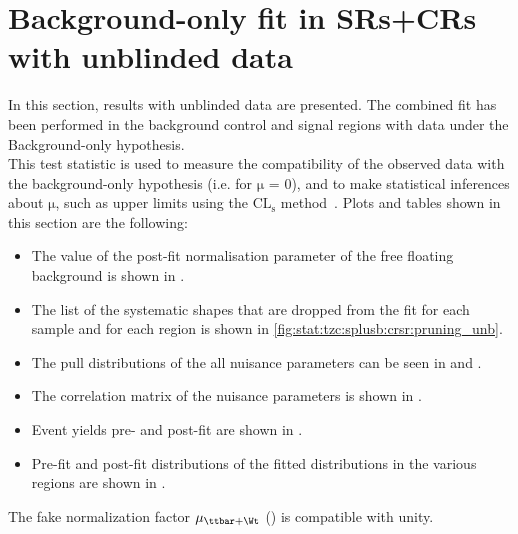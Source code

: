 \section{Background-only fit in SRs+CRs with unblinded data}
\label{sec:stat:tzc:unb}
In this section, results with unblinded data are presented. The combined fit has been performed in the background 
control and signal regions with data under the Background-only hypothesis.\\
This test statistic is used to measure the compatibility of the observed data with the background-only hypothesis 
(i.e. for $\mathrm{\mu}$ = 0), and to make statistical inferences about $\mathrm{\mu}$, such as upper limits using the $\mathrm{CL_{s}}$ method~\cite{Junk:1999kv,Read:2002hq}.
Plots and tables shown in this section are the following:
\begin{itemize}
	\item The value of the post-fit normalisation parameter of the free floating background is shown in .
	\item The list of the systematic shapes that are dropped from the fit for each sample and for each region is shown in \cref{fig:stat:tzc:splusb:crsr:pruning_unb}.
	\item The pull distributions of the all nuisance parameters can be seen in  and . 
	\item The correlation matrix of the nuisance parameters is shown in . 
	\item Event yields pre- and post-fit are shown in . 
	\item Pre-fit and post-fit distributions of the fitted distributions in the various regions are shown in .
\end{itemize}
The fake normalization factor $\mu_{\ttbar+\Wt}$ () is compatible with unity.\\
